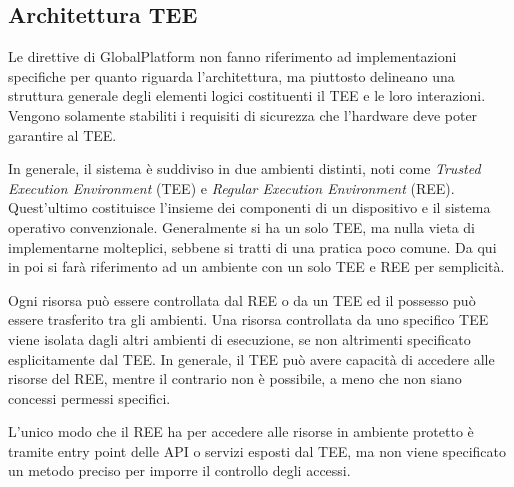 \documentclass[12pt,italian]{report}
\begin{document}
	\newpage
	
	\subsection{Architettura TEE}
	\label{subsec:architettura}
 	Le direttive di GlobalPlatform non fanno riferimento ad implementazioni specifiche per quanto riguarda l'architettura, ma piuttosto delineano una struttura generale degli elementi logici costituenti il TEE e le loro interazioni. Vengono solamente stabiliti i requisiti di sicurezza che l'hardware deve poter garantire al TEE.
 	
 	\bigbreak
 	
 	In generale, il sistema è suddiviso in due ambienti distinti, noti come \textit{Trusted Execution Environment} (TEE) e \textit{Regular Execution Environment} (REE). Quest'ultimo costituisce l'insieme dei componenti di un dispositivo e il sistema operativo convenzionale. Generalmente si ha un solo TEE, ma nulla vieta di implementarne molteplici, sebbene si tratti di una pratica poco comune. Da qui in poi si farà riferimento ad un ambiente con un solo TEE e REE per semplicità.
 	
 	Ogni risorsa può essere controllata dal REE o da un TEE ed il possesso può essere trasferito tra gli ambienti. Una risorsa controllata da uno specifico TEE viene isolata dagli altri ambienti di esecuzione, se non altrimenti specificato esplicitamente dal TEE. In generale, il TEE può avere capacità di accedere alle risorse del REE, mentre il contrario non è possibile, a meno che non siano concessi permessi specifici. 
 	
 	L'unico modo che il REE ha per accedere alle risorse in ambiente protetto è tramite entry point delle API o servizi esposti dal TEE, ma non viene specificato un metodo preciso per imporre il controllo degli accessi.
 	
\end{document}
